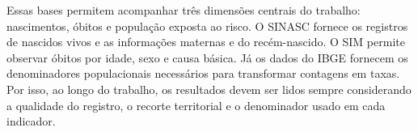 Essas bases permitem acompanhar três dimensões centrais do trabalho: nascimentos, óbitos e população exposta ao risco. O SINASC fornece os registros de nascidos vivos e as informações maternas e do recém-nascido. O SIM permite observar óbitos por idade, sexo e causa básica. Já os dados do IBGE fornecem os denominadores populacionais necessários para transformar contagens em taxas. Por isso, ao longo do trabalho, os resultados devem ser lidos sempre considerando a qualidade do registro, o recorte territorial e o denominador usado em cada indicador.
